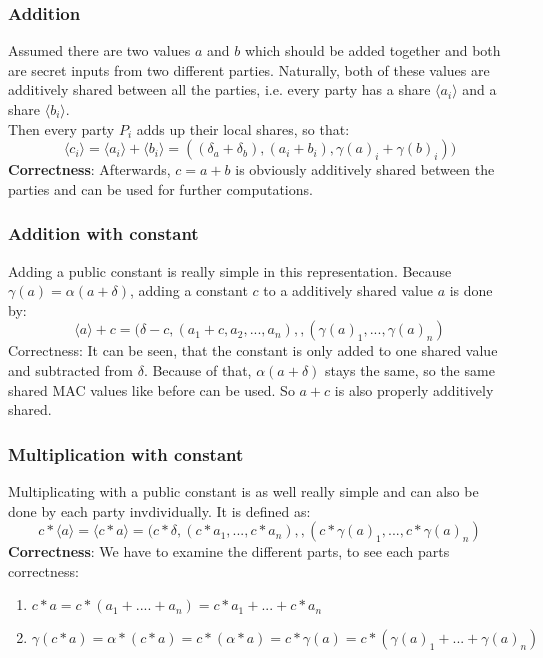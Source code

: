 \documentclass[english,runningheads,a4paper]{llncs}[2018/03/10]
\begin{document}
\subsubsection{Addition}
Assumed there are two values \( a\) and \( b\) which should be added together and both are secret inputs from two different parties. Naturally, both of these values are additively shared between all the parties, i.e. every party has a share \( \langle a_i\rangle\) and a share \( \langle b_i\rangle\).\\

Then every party \( P_i\) adds up their local shares, so that:\\
$$\langle c_i\rangle=\langle a_i\rangle+\langle b_i\rangle=((\delta_a+\delta_b),(a_i+b_i),\gamma (a)_i+\gamma (b)_i))$$
\textbf{Correctness}: Afterwards, \( c=a+b\) is obviously additively shared between the parties and can be used for further computations.\\

\subsubsection{Addition with constant}
Adding a public constant is really simple in this representation. Because \( \gamma (a)=\alpha(a+\delta)\), adding a constant \(c\) to a additively shared value \(a\) is done by:\\
$$\langle a\rangle+c=(\delta-c,(a_1+c,a_2,...,a_n),,(\gamma (a)_1,...,\gamma (a)_n)$$
Correctness: It can be seen, that the constant is only added to one shared value and subtracted from \( \delta\). Because of that, \( \alpha(a+\delta)\) stays the same, so the same shared MAC values like before can be used. So \(a+c\) is also properly additively shared.\\

\subsubsection{Multiplication with constant}
Multiplicating with a public constant is as well really simple and can also be done by each party invdividually. It is defined as:\\
$$c*\langle a\rangle=\langle c*a\rangle=(c*\delta,(c*a_1,...,c*a_n),,(c*\gamma (a)_1,...,c*\gamma (a)_n)$$
\textbf{Correctness}: We have to examine the different parts, to see each parts correctness: \\

\begin{enumerate}
\item \(  c*a = c * (a_1+....+a_n) = c*a_1+...+c*a_n \)
\item \( \gamma (c*a) = \alpha*(c*a) = c*(\alpha * a) = c * \gamma (a) = c* ( \gamma (a)_1+...+\gamma (a)_n)  \)
\end{enumerate}
\end{document}
